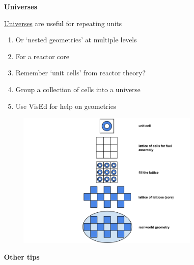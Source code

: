 \documentclass[aspectratio=1610,pdftex,dvipsnames,compress,xcolor={dvipsnames}]{beamer}
\begin{document}
\begin{frame}[plain]{}
    \centering\LARGE\textbf{Universes}
\end{frame}


\addtocounter{framenumber}{-1} 
\begin{frame}{\href{https://github.com/TheDoctorRAB/igem}{Universes} are useful for repeating units}
    \begin{enumerate}[series=outerlist,topsep=0pt,itemsep=21pt,leftmargin=*,label=(\arabic*)]
        \item[]Or `nested geometries' at multiple levels
        \item[]For a reactor core
        \item[]Remember `unit cells' from reactor theory?
        \item[]Group a collection of cells into a universe
        \item[]Use VisEd for help on geometries
    \end{enumerate}
\end{frame}


\begin{frame}{}
    \begin{figure}
        \centering
        \includegraphics[width=0.80\textwidth]{mcnp_universe.jpg}
    \end{figure}
\end{frame}


\begin{frame}[plain]{}
    \centering\LARGE\textbf{Other tips}
\end{frame}
\end{document}
